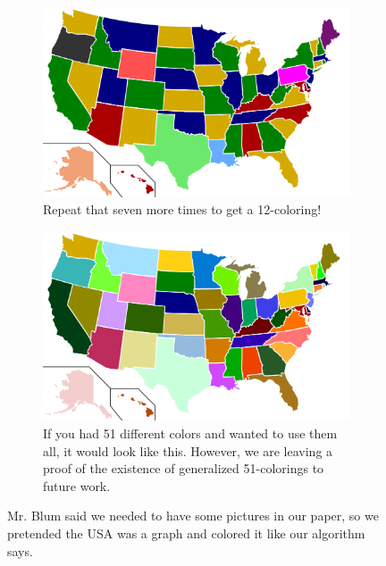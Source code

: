 \documentclass{article}
\begin{document}
\begin{figure}
	\begin{subfigure}[b]{0.45\textwidth}
	\includegraphics[width=\textwidth]{12color.pdf}
	\caption{Repeat that seven more times to get a 12-coloring! \\ \vspace{3.3em}}
	\end{subfigure}
	\quad
	\begin{subfigure}[b]{0.45\textwidth}
	\includegraphics[width=\textwidth]{50color.pdf}
	\caption{If you had 51 different colors and wanted to use them all, it would look like this. However, we are leaving a proof of the existence of generalized 51-colorings to future work.}
	\end{subfigure}
	\caption{Mr. Blum said we needed to have some pictures in our paper, so we pretended the USA was a graph and colored it like our algorithm says.}
	\label{fig:usa}
\end{figure}
\end{document}

